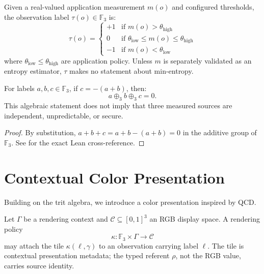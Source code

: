 \documentclass[preprint,nohyperxmp]{iacrtrans}
\begin{document}
\begin{definition}
Given a real-valued application measurement $m(o)$ and configured thresholds,
the observation label $\tau(o)\in\mathbb F_3$ is:
\[
\tau(o) = \begin{cases}
    +1 & \text{if } m(o) > \theta_{\text{high}} \\
    0 & \text{if } \theta_{\text{low}} \le m(o) \le \theta_{\text{high}} \\
    -1 & \text{if } m(o) < \theta_{\text{low}}
\end{cases}
\]
where $\theta_{\text{low}}\le\theta_{\text{high}}$ are application policy.
Unless $m$ is separately validated as an entropy estimator, $\tau$ makes no
statement about min-entropy.
\end{definition}

\begin{proposition}
\label{thm:conservation}
For labels $a,b,c\in\mathbb{F}_3$, if $c=-(a+b)$, then:
\[
a \oplus_3 b \oplus_3 c = 0.
\]
This algebraic statement does not imply that three measured sources are independent, unpredictable, or secure.
\end{proposition}

\begin{proof}
By substitution, $a+b+c=a+b-(a+b)=0$ in the additive group of $\mathbb{F}_3$. See  for the exact Lean cross-reference.
\end{proof}

\section{Contextual Color Presentation}
\label{sec:color}

Building on the trit algebra, we introduce a color presentation inspired by QCD.

\begin{definition}
Let $\Gamma$ be a rendering context and $\mathcal C\subseteq[0,1]^3$ an RGB
display space. A rendering policy
\[
\kappa:\mathbb F_3\times\Gamma\longrightarrow\mathcal C
\]
may attach the tile $\kappa(\ell,\gamma)$ to an observation carrying label
$\ell$. The tile is contextual presentation metadata; the typed referent
$\rho$, not the RGB value, carries source identity.
\end{definition}
\end{document}
